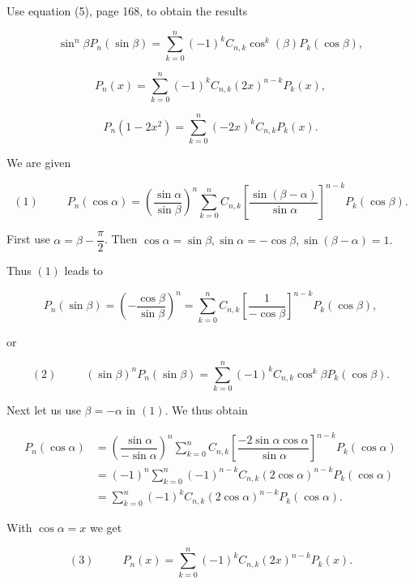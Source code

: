 \begin{problem}\label{problem7chapter10}
Use equation (5), page 168, to obtain the results

$$\sin^n \beta P_n(\sin \beta) = \displaystyle\sum_{k=0}^n (-1)^k C_{n,k} \cos^k (\beta) P_k(\cos \beta),$$

$$P_n(x) = \displaystyle\sum_{k=0}^n (-1)^k C_{n,k} (2x)^{n-k} P_k(x),$$

$$P_n(1-2x^2) = \displaystyle\sum_{k=0}^n (-2x)^k C_{n,k} P_k(x).$$
\end{problem}
\begin{solution}
We are given

$$(1) \hspace{30pt} P_n(\cos \alpha) = \left( \dfrac{\sin \alpha}{\sin \beta} \right)^n \displaystyle\sum_{k=0}^n C_{n,k} \left[ \dfrac{\sin(\beta - \alpha)}{\sin \alpha} \right]^{n-k} P_k(\cos \beta).$$

First use $\alpha = \beta - \dfrac{\pi}{2}$. Then $\cos \alpha = \sin \beta, \sin \alpha = - \cos \beta, \sin(\beta - \alpha) =1.$

Thus $(1)$ leads to 

$$P_n(\sin \beta) = \left( -\dfrac{\cos \beta}{\sin \beta} \right)^n = \displaystyle\sum_{k=0}^n C_{n,k} \left[ \dfrac{1}{-\cos \beta} \right]^{n-k} P_k(\cos \beta),$$

or

$$(2) \hspace{30pt} (\sin \beta)^n P_n(\sin \beta) = \displaystyle\sum_{k=0}^n (-1)^k C_{n,k} \cos^k \beta P_k(\cos \beta).$$

Next let us use $\beta = -\alpha$ in $(1)$. We thus obtain

$$\begin{array}{ll}
P_n(\cos \alpha) &= \left( \dfrac{\sin \alpha}{- \sin \alpha} \right)^n \displaystyle\sum_{k=0}^n C_{n,k} \left[ \dfrac{-2\sin \alpha \cos \alpha}{\sin \alpha} \right]^{n-k} P_k(\cos \alpha) \\
&= (-1)^n \displaystyle\sum_{k=0}^n (-1)^{n-k} C_{n,k} (2 \cos \alpha)^{n-k} P_k(\cos \alpha) \\
&= \displaystyle\sum_{k=0}^n (-1)^k C_{n,k} (2 \cos \alpha)^{n-k} P_k(\cos \alpha).
\end{array}$$

With $\cos \alpha = x$ we get

$$(3) \hspace{30pt} P_n(x) = \displaystyle\sum_{k=0}^n (-1)^k C_{n,k} (2x)^{n-k} P_k(x).$$


\end{solution}
